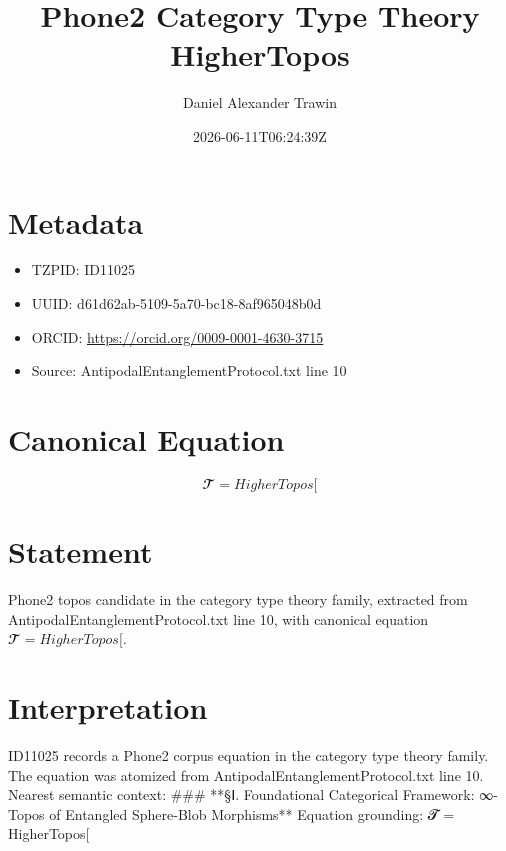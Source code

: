 \documentclass[11pt]{article}
\title{Phone2 Category Type Theory HigherTopos}
\author{Daniel Alexander Trawin}
\date{2026-06-11T06:24:39Z}
\begin{document}
\maketitle
\section*{Metadata}
\begin{itemize}
\item TZPID: ID11025
\item UUID: d61d62ab-5109-5a70-bc18-8af965048b0d
\item ORCID: \url{https://orcid.org/0009-0001-4630-3715}
\item Source: AntipodalEntanglementProtocol.txt line 10
\end{itemize}
\section*{Canonical Equation}
\[
𝓣 = HigherTopos[
\]
\section*{Statement}
Phone2 topos candidate in the category type theory family, extracted from AntipodalEntanglementProtocol.txt line 10, with canonical equation $𝓣 = HigherTopos[$.
\section*{Interpretation}
ID11025 records a Phone2 corpus equation in the category type theory family. The equation was atomized from AntipodalEntanglementProtocol.txt line 10. Nearest semantic context: ### **§Ⅰ. Foundational Categorical Framework: ∞-Topos of Entangled Sphere-Blob Morphisms** Equation grounding: 𝓣 = HigherTopos[
\end{document}
